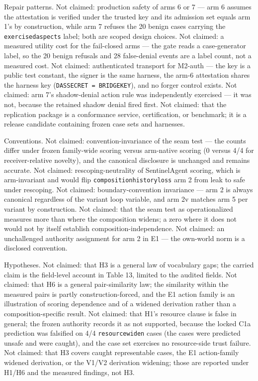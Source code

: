 \documentclass[
  10pt,
]{article}
\let\origtexttt\texttt
\renewcommand{\texttt}[1]{{\upshape\origtexttt{#1}}}
\renewcommand{\_}{\allowbreak\origunderscore}
\begin{document}
Repair patterns. Not claimed: production safety of arms 6 or 7 --- arm 6
assumes the attestation is verified under the trusted key and its
admission set equals arm 1's by construction, while arm 7 refuses the 20
benign cases carrying the \texttt{exercised\_aspects} label; both are
scoped design choices. Not claimed: a measured utility cost for the
fail-closed arms --- the gate reads a case-generator label, so the 20
benign refusals and 28 false-denial events are a label count, not a
measured cost. Not claimed: authenticated transport for M2-auth --- the
key is a public test constant, the signer is the same harness, the arm-6
attestation shares the harness key
(\texttt{DAS\_SECRET\ =\ BRIDGE\_KEY}), and no forger control exists.
Not claimed: arm 7's shadow-denial action rule was independently
exercised --- it was not, because the retained shadow denial fired
first. Not claimed: that the replication package is a conformance
service, certification, or benchmark; it is a release candidate
containing frozen case sets and harnesses.

Conventions. Not claimed: convention-invariance of the seam test --- the
counts differ under frozen family-wide scoring versus arm-native scoring
(0 versus 4/4 for receiver-relative novelty), and the canonical
disclosure is unchanged and remains accurate. Not claimed:
rescoping-neutrality of SentinelAgent scoring, which is arm-invariant
and would flip \texttt{composition\_history\_loss} arm 2 from leak to
safe under rescoping. Not claimed: boundary-convention invariance ---
arm 2 is always canonical regardless of the variant loop variable, and
arm 2v matches arm 5 per variant by construction. Not claimed: that the
seam test as operationalized measures more than where the composition
widens; a zero where it does not would not by itself establish
composition-independence. Not claimed: an unchallenged authority
assignment for arm 2 in E1 --- the own-world norm is a disclosed
convention.

Hypotheses. Not claimed: that H3 is a general law of vocabulary gaps;
the carried claim is the field-level account in Table 13, limited to the
audited fields. Not claimed: that H6 is a general pair-similarity law;
the similarity within the measured pairs is partly construction-forced,
and the E1 action family is an illustration of scoring dependence and of
a widened derivation rather than a composition-specific result. Not
claimed: that H1's resource clause is false in general; the frozen
authority records it as not supported, because the locked C1a prediction
was falsified on 4/4 \texttt{resource\_widen} cases (the cases were
predicted unsafe and were caught), and the case set exercises no
resource-side trust failure. Not claimed: that H3 covers caught
representable cases, the E1 action-family widened derivation, or the
V1/V2 derivation widening; those are reported under H1/H6 and the
measured findings, not H3.
\end{document}

